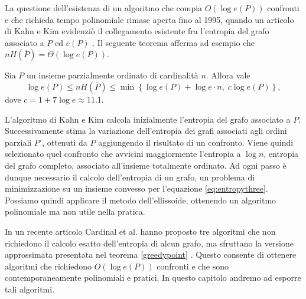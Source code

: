 La questione dell'esistenza di un algoritmo che compia \(O(\log{e(P)})\) confronti e che richieda tempo polinomiale rimase aperta fino al 1995, quando un articolo di Kahn e Kim evidenziò il collegamento esistente fra l'entropia del grafo associato a \(P\) ed \(e(P)\) \cite{Kahn1995}. Il seguente teorema afferma ad esempio che \(nH(\overline{P})=\Theta(\log{e(P)})\). 
\begin{theorem}
	 \label{kktheorem} Sia \(P\) un insieme parzialmente ordinato di cardinalità \(n\). Allora vale
	\[\log{e(P)}\le nH\left(\overline{P}\right)\le\min\left\{\log{e(P)}+\log{e\cdot n},\; c\log{e(P)}\right\},\]
	dove \(c=1+7\log{e}\approx 11.1\). 
\end{theorem}
L'algoritmo di Kahn e Kim calcola inizialmente l'entropia del grafo associato a \(P\). Successivamente stima la variazione dell'entropia dei grafi associati agli ordini parziali \(P'\), ottenuti da \(P\) aggiungendo il risultato di un confronto. Viene quindi selezionato quel confronto che avvicini maggiormente l'entropia a \(\log{n}\), entropia del grafo completo, associato all'insieme totalmente ordinato. Ad ogni passo è dunque necessario il calcolo dell'entropia di un grafo, un problema di minimizzazione su un insieme convesso per l'equazione \ref{eq:entropythree}. Possiamo quindi applicare il metodo dell'ellissoide, ottenendo un algoritmo polinomiale ma non utile nella pratica.

In un recente articolo Cardinal et al. hanno proposto tre algoritmi che non richiedono il calcolo esatto dell'entropia di alcun grafo, ma sfruttano la versione approssimata presentata nel teorema \ref{greedypoint} \cite{Cardinal2010}. Questo consente di ottenere algoritmi che richiedono \(O(\log{e(P)})\) confronti e che sono contemporaneamente polinomiali e pratici. In questo capitolo andremo ad esporre tali algoritmi.

